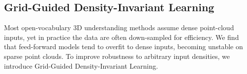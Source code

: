 \documentclass[10pt,twocolumn,letterpaper]{article}
\begin{document}
\begin{table}[tb]
    \centering
    \caption{Ablation study on module design and compressed feature dimensions. Left: component ablation on ScanNet200 and LERF using 16-dim features. Right: accuracy--latency trade-off with varying feature dimensions on LERF.}
    \label{tab:ablation-main}
    \centering
\end{table}

\subsection{Grid-Guided Density-Invariant Learning}
Most open-vocabulary 3D understanding methods assume dense point-cloud inputs, yet in practice the data are often down-sampled for efficiency. We find that feed-forward models tend to overfit to dense inputs, becoming unstable on sparse point clouds. To improve robustness to arbitrary input densities, we introduce Grid-Guided Density-Invariant Learning.
\end{document}
